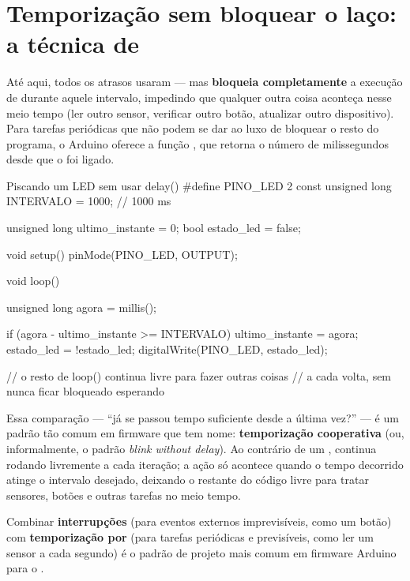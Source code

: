 \section{Temporização sem bloquear o laço: a técnica de }

Até aqui, todos os atrasos usaram  — mas  \textbf{bloqueia completamente} a execução de  durante aquele intervalo, impedindo que qualquer outra coisa aconteça nesse meio tempo (ler outro sensor, verificar outro botão, atualizar outro dispositivo). Para tarefas periódicas que não podem se dar ao luxo de bloquear o resto do programa, o Arduino oferece a função , que retorna o número de milissegundos desde que o \ESP{} foi ligado.

\begin{codigoc}{Piscando um LED sem usar delay()}
#define PINO_LED 2
const unsigned long INTERVALO = 1000;   // 1000 ms

unsigned long ultimo_instante = 0;
bool estado_led = false;

void setup() {
    pinMode(PINO_LED, OUTPUT);
}

void loop() {
    unsigned long agora = millis();

    if (agora - ultimo_instante >= INTERVALO) {
        ultimo_instante = agora;
        estado_led = !estado_led;
        digitalWrite(PINO_LED, estado_led);
    }

    // o resto de loop() continua livre para fazer outras coisas
    // a cada volta, sem nunca ficar bloqueado esperando
}
\end{codigoc}

Essa comparação — ``já se passou tempo suficiente desde a última vez?'' — é um padrão tão comum em firmware que tem nome: \textbf{temporização cooperativa} (ou, informalmente, o padrão \emph{blink without delay}). Ao contrário de um ,  continua rodando livremente a cada iteração; a ação só acontece quando o tempo decorrido atinge o intervalo desejado, deixando o restante do código livre para tratar sensores, botões e outras tarefas no meio tempo.

\begin{esp32box}
Combinar \textbf{interrupções} (para eventos externos imprevisíveis, como um botão) com \textbf{temporização por } (para tarefas periódicas e previsíveis, como ler um sensor a cada segundo) é o padrão de projeto mais comum em firmware Arduino para o \ESP{}.
\end{esp32box}

